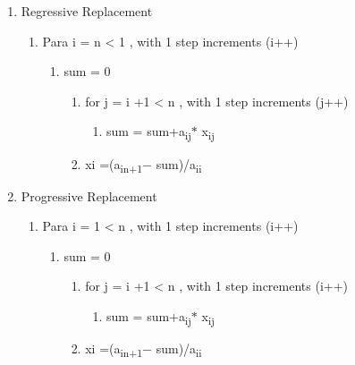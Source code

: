 \documentclass[12pt]{article}
\renewcommand{\_}{\kern-1.5pt\textunderscore\kern-1.5pt}
\begin{document}
\begin{enumerate}
	\item Regressive Replacement \par

\begin{enumerate}
	\item Para i = n < 1 , with 1 step increments (i++) \par

\begin{enumerate}
	\item sum = 0\par

\begin{enumerate}
	\item for j = i +1 < n , with 1 step increments (j++) \par

\begin{enumerate}
	\item sum = sum+a\textsubscript{ij}$\ast$ x\textsubscript{ij}\par


\end{enumerate}
	\item xi =(a\textsubscript{in+1}$-$ sum)/a\textsubscript{ii}\par


\end{enumerate}
\end{enumerate}
\end{enumerate}
	\item Progressive Replacement \par

\begin{enumerate}
	\item Para i = 1 < n , with 1 step increments (i++) \par

\begin{enumerate}
	\item sum = 0\par

\begin{enumerate}
	\item for j = i +1 < n , with 1 step increments (i++) \par

\begin{enumerate}
	\item sum = sum+a\textsubscript{ij}$\ast$ x\textsubscript{ij}\par


\end{enumerate}
	\item xi =(a\textsubscript{in+1}$-$ sum)/a\textsubscript{ii}
\end{enumerate}
\end{enumerate}
\end{enumerate}
\end{enumerate}\par


\vspace{\baselineskip}

\printbibliography
\end{document}
